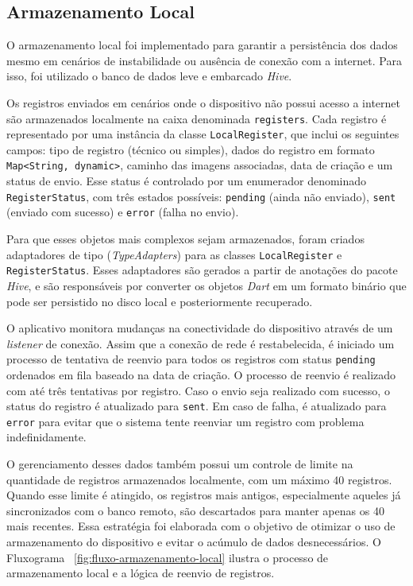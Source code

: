 \subsection{Armazenamento Local}\label{subsec:armazenamento_local}

O armazenamento local foi implementado para garantir a persistência dos dados mesmo em cenários de instabilidade ou ausência de conexão com a internet. Para isso, foi utilizado o banco de dados leve e embarcado \textit{Hive}.

Os registros enviados em cenários onde o dispositivo não possui acesso a internet são armazenados localmente na caixa denominada \texttt{registers}. Cada registro é representado por uma instância da classe \texttt{LocalRegister}, que inclui os seguintes campos: tipo de registro (técnico ou simples), dados do registro em formato \texttt{Map<String, dynamic>}, caminho das imagens associadas, data de criação e um status de envio. Esse status é controlado por um enumerador denominado \texttt{RegisterStatus}, com três estados possíveis: \texttt{pending} (ainda não enviado), \texttt{sent} (enviado com sucesso) e \texttt{error} (falha no envio).

Para que esses objetos mais complexos sejam armazenados, foram criados adaptadores de tipo (\textit{TypeAdapters}) para as classes \texttt{LocalRegister} e \texttt{RegisterStatus}. Esses adaptadores são gerados a partir de anotações do pacote \textit{Hive}, e são responsáveis por converter os objetos \textit{Dart} em um formato binário que pode ser persistido no disco local e posteriormente recuperado.

O aplicativo monitora mudanças na conectividade do dispositivo através de um \textit{listener} de conexão. Assim que a conexão de rede é restabelecida, é iniciado um processo de tentativa de reenvio para todos os registros com status \texttt{pending} ordenados em fila baseado na data de criação. O processo de reenvio é realizado com até três tentativas por registro. Caso o envio seja realizado com sucesso, o status do registro é atualizado para \texttt{sent}. Em caso de falha, é atualizado para \texttt{error} para evitar que o sistema tente reenviar um registro com problema indefinidamente.

O gerenciamento desses dados também possui um controle de limite na quantidade de registros armazenados localmente, com um máximo 40 registros. Quando esse limite é atingido, os registros mais antigos, especialmente aqueles já sincronizados com o banco remoto, são descartados para manter apenas os 40 mais recentes. Essa estratégia foi elaborada com o objetivo de otimizar o uso de armazenamento do dispositivo e evitar o acúmulo de dados desnecessários. O Fluxograma ~\ref{fig:fluxo-armazenamento-local} ilustra o processo de armazenamento local e a lógica de reenvio de registros.

